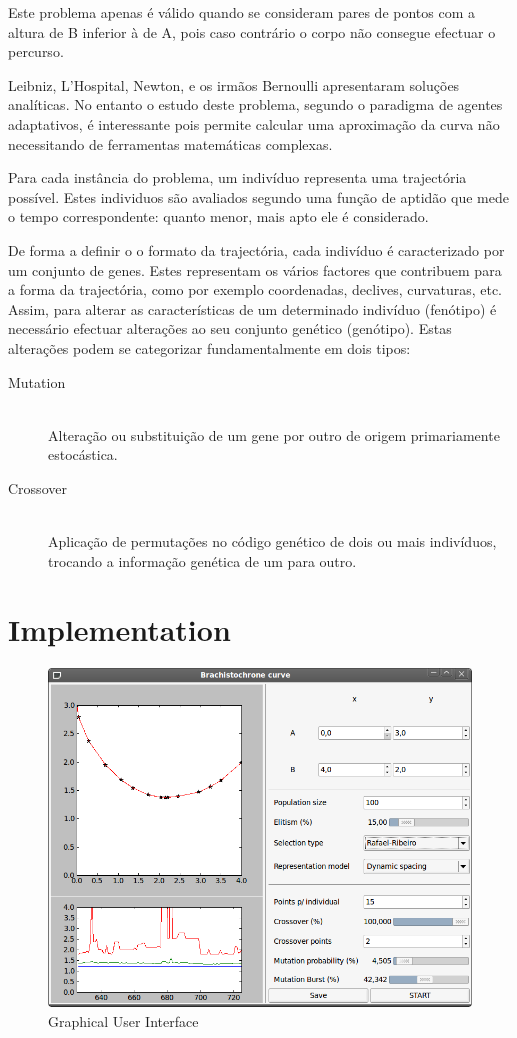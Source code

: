 \documentclass[a4paper]{article}
\begin{document}
\indent Este problema apenas é válido quando se consideram pares de pontos com a altura de B inferior à de A, pois caso contrário o corpo não consegue efectuar o percurso.

Leibniz, L'Hospital, Newton, e os irmãos Bernoulli apresentaram soluções analíticas.
No entanto o estudo deste problema, segundo o paradigma de agentes adaptativos, é interessante pois permite calcular uma aproximação da curva
não necessitando de ferramentas matemáticas complexas.

\indent Para cada instância do problema, um indivíduo representa uma trajectória possível. Estes individuos são avaliados segundo uma
função de aptidão que mede o tempo correspondente: quanto menor, mais apto ele é considerado.

\indent De forma a definir o o formato da trajectória, cada indivíduo é caracterizado por um conjunto de genes. Estes representam os vários
factores que contribuem para a forma da trajectória, como por exemplo coordenadas, declives, curvaturas, etc. Assim, para alterar as características
de um determinado indivíduo (fenótipo) é necessário efectuar alterações ao seu conjunto genético (genótipo). Estas alterações podem se categorizar
fundamentalmente em dois tipos:

\begin{description}
	\item[Mutation] \hfill \\ 
		Alteração ou substituição de um gene por outro de origem primariamente estocástica.
	\item[Crossover] \hfill \\ 
		Aplicação de permutações no código genético de dois ou mais indivíduos, trocando a informação genética de um para outro.
\end{description}

\cleardoublepage
\section{Implementation}
\begin{figure}[ht]
	\centering
	\includegraphics[scale=0.50]{images/GUI.png}
	\caption{Graphical User Interface}
	\label{fig:gui}
\end{figure}
\end{document}
